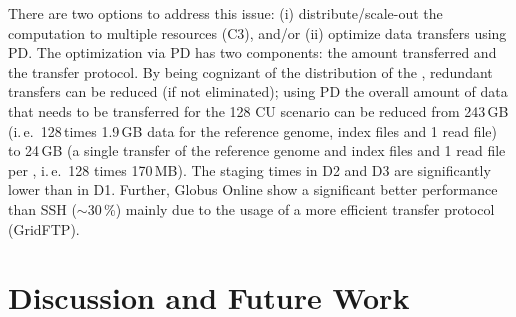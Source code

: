 \documentclass[conference]{IEEEtran}
\begin{document}
There are two options to address this issue: (i) distribute/scale-out
the computation to multiple resources (C3), and/or (ii) optimize data
transfers using PD.  The optimization via PD 
has two components: the amount transferred and the transfer protocol.  By
being cognizant of the distribution of the \cus, redundant transfers
can be reduced (if not eliminated); using PD the overall
amount of data that needs to be transferred for the 128 CU scenario
can be reduced from 243\,GB (i.\,e.\ 128\,\cus times 1.9\,GB data for
the reference genome, index files and 1 read file) to 24\,GB (a single
transfer of the reference genome and index files and 1 read file per
\cu, i.\,e.\ 128 times 170\,MB).  The staging times in D2 and D3 are
significantly lower than in D1. Further, Globus Online show a
significant better performance than SSH ($\sim$30\,\%) mainly due to
the usage of a more efficient transfer protocol (GridFTP).




% 
% 



\section{Discussion and Future Work}

\label{sec:discussion-future-work}
\end{document}
